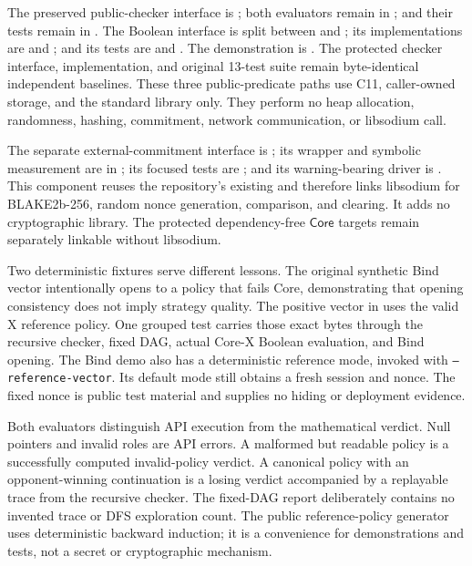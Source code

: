 \begin{sloppypar}
The preserved public-checker interface is ; both
evaluators remain in ; and their tests remain in
. The Boolean interface is split between
 and
; its implementations are
 and
; and its tests are
 and
. The demonstration is
. The protected
checker interface, implementation, and original 13-test suite remain
byte-identical independent baselines. These three public-predicate paths use C11,
caller-owned storage, and the standard library only. They perform no heap
allocation, randomness, hashing, commitment, network communication, or
libsodium call.
\end{sloppypar}

\begin{sloppypar}
The separate external-commitment interface is
; its wrapper and symbolic measurement are in
; its focused tests are
; and its warning-bearing driver is
.
This component reuses the repository's existing
 and therefore links libsodium for
BLAKE2b-256, random nonce generation, comparison, and clearing. It adds no
cryptographic library. The protected dependency-free \(\mathsf{Core}\)
targets remain separately linkable without libsodium.
\end{sloppypar}

Two deterministic fixtures serve different lessons. The original synthetic
Bind vector intentionally opens to a policy that fails Core, demonstrating
that opening consistency does not imply strategy quality. The positive vector
in  uses the valid X reference
policy. One grouped test carries those exact bytes through the recursive
checker, fixed DAG, actual Core-X Boolean evaluation, and Bind opening. The
Bind demo also has a deterministic reference mode, invoked with
\texttt{--reference-vector}. Its default mode still obtains a fresh session
and nonce. The fixed nonce is
public test material and supplies no hiding or deployment evidence.

Both evaluators distinguish API execution from the mathematical verdict. Null
pointers and invalid roles are API errors. A malformed but readable policy is
a successfully computed invalid-policy verdict. A canonical policy with an
opponent-winning continuation is a losing verdict accompanied by a replayable
trace from the recursive checker. The fixed-DAG report deliberately contains
no invented trace or DFS exploration count. The public reference-policy
generator uses deterministic backward
induction; it is a convenience for demonstrations and tests, not a secret or
cryptographic mechanism.

